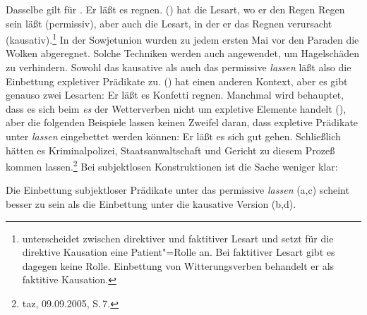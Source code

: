 \eal
{}
\zl
Dasselbe gilt für .
\ea
\label{bsp-er-laesst-es-regnen}
Er läßt es regnen.
\z
() hat die Lesart, wo er den Regen Regen sein läßt (permissiv), aber auch die
Lesart, in der er das Regnen verursacht (kausativ).\footnote{
        \citet[]{Gunkel2003b} unterscheidet zwischen direktiver und
        faktitiver Lesart und setzt für die direktive Kausation eine Patient"=Rolle
        an. Bei faktitiver Lesart gibt es dagegen keine Rolle. Einbettung
        von Witterungsverben behandelt er als faktitive Kausation.%
}
In der Sowjetunion wurden zu jedem ersten Mai vor den Paraden die Wolken abgeregnet.
Solche Techniken werden auch angewendet, um Hagelschäden zu verhindern.
Sowohl das kausative als auch das permissive \emph{lassen} läßt also die
Einbettung expletiver Prädikate zu.
() hat einen anderen Kontext, aber es gibt genauso zwei Lesarten:
\ea
Er läßt es Konfetti regnen.
\z
Manchmal wird behauptet, dass es sich beim \emph{es} der Wetterverben
nicht um expletive Elemente handelt (\citealp[]{Paul1919a}),
aber die folgenden Beispiele lassen keinen Zweifel daran, dass expletive Prädikate unter
\emph{lassen} eingebettet werden können:
\eal
\ex Er läßt es        sich gut  gehen.
\ex Schließlich hätten es Kriminalpolizei, Staatsanwaltschaft und Gericht zu diesem Prozeß kommen lassen.\footnote{
  taz, 09.09.2005, S.\,7.
}
\zl
%
Bei subjektlosen Konstruktionen ist die Sache weniger klar:

\eal
{}
\zl
Die Einbettung subjektloser Prädikate unter das permissive \emph{lassen} (a,c)
scheint besser zu sein als die Einbettung unter die kausative Version (b,d).

